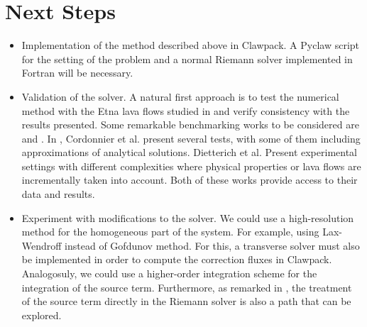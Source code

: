 \documentclass[12pt]{article}
\begin{document}
\section{Next Steps}
\begin{itemize}
    \item Implementation of the method described above in Clawpack. 
        A Pyclaw script for the setting of the problem and a normal Riemann solver implemented in Fortran will be necessary.
    \item Validation of the solver. A natural first approach is to test the numerical method with the Etna lava flows studied in \cite{costa2005numerical} and verify consistency with the results presented.
        Some remarkable benchmarking works to be considered are \cite{cordonnier2016benchmarking} and \cite{dietterich2017benchmarking}. 
        In \cite{cordonnier2016benchmarking}, Cordonnier et al. present several tests, with some of them including approximations of analytical solutions.
        Dietterich et al. Present experimental settings with different complexities where physical properties or lava flows are incrementally taken into account. 
        Both of these works provide access to their data and results.
    \item Experiment with modifications to the solver.
        We could use a high-resolution method for the homogeneous part of the system.
        For example, using Lax-Wendroff instead of Gofdunov method. 
        For this, a transverse solver must also be implemented in order to compute the correction fluxes in Clawpack.
        Analogosuly, we could use a higher-order integration scheme for the integration of the source term.
        Furthermore, as remarked in \cite{costa2005numerical}, the treatment of the source term directly in the Riemann solver is also a path that can be explored.

\end{itemize}


\end{document}
